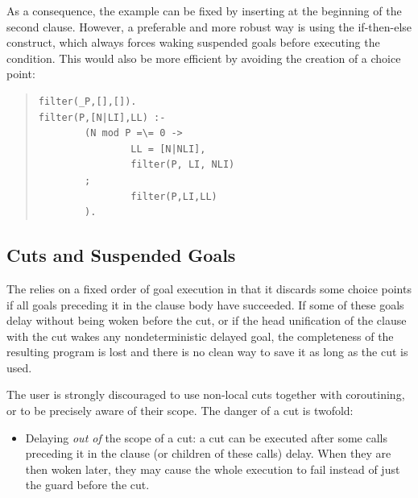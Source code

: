 {As a consequence, the example can be fixed by inserting  at the
beginning of the second clause.
However, a preferable and more robust way is using the if-then-else
construct, which always forces waking suspended goals before
executing the condition.
This would also be more efficient by avoiding the creation of a choice point:
\begin{quote}
\begin{verbatim}
filter(_P,[],[]).
filter(P,[N|LI],LL) :-
        (N mod P =\= 0 ->
                LL = [N|NLI],
                filter(P, LI, NLI)
        ;
                filter(P,LI,LL)
        ).
\end{verbatim}
\end{quote}



\subsection{Cuts and Suspended Goals}
\label{delaycut}%
The
relies on a fixed order of goal execution in that it discards
some choice points if all goals preceding it in the clause body have
succeeded.
If some of these goals delay without being woken before the cut,
or if the head unification of the
clause with the cut wakes any nondeterministic delayed goal,
the completeness of the resulting program is lost
and there is no clean way to save it as long as the cut is used.

The user is strongly discouraged to use non-local cuts together with
coroutining, or to be precisely aware of their scope.
The danger of a cut is twofold:
\begin{itemize}
\item Delaying \emph{out of} the scope of a cut:
a cut can be executed after some calls preceding it in the clause
(or children of these calls) delay. When they are then woken later,
they may cause the whole execution to fail instead of just the
guard before the cut.


\end{itemize}}
